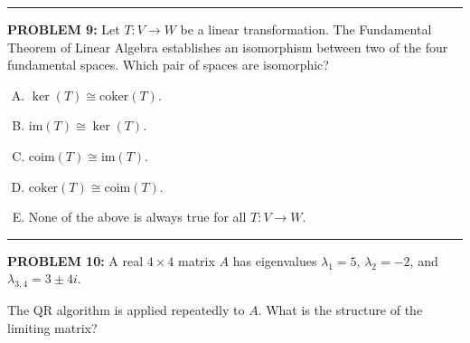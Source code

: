 \documentclass[12pt]{amsart}
\newcommand{\divider}{
  \vspace{-1em} %
  \noindent
  \raisebox{-0.15ex}{\textbullet}%
  \hspace{0.5em}%
  \rule[0.5ex]{0.95\textwidth}{1.0pt}%
  \hspace{0.5em}%
  \raisebox{-0.15ex}{\textbullet}%
  \vspace{0em} %
}
\begin{document}
{\divider

{\bf PROBLEM 9:}
%
Let $T: V \to W$ be a linear transformation. The Fundamental Theorem of Linear Algebra establishes an isomorphism between two of the four fundamental spaces. Which pair of spaces are isomorphic?

\begin{enumerate}[(A)]
\item $\ker(T) \cong \text{coker}(T)$.

\item $\text{im}(T) \cong \ker(T)$.

\item $\text{coim}(T) \cong \text{im}(T)$.

\item $\text{coker}(T) \cong \text{coim}(T)$.

\item None of the above is always true for all $T:V\to W$.
\end{enumerate}


\divider

\newpage

{\bf PROBLEM 10:}
% 
A real $4 \times 4$ matrix $A$ has eigenvalues $\lambda_1 = 5$, $\lambda_2 = -2$, and $\lambda_{3,4} = 3 \pm 4i$.

The QR algorithm is applied repeatedly to $A$. What is the structure of the limiting matrix?

}
\end{document}
